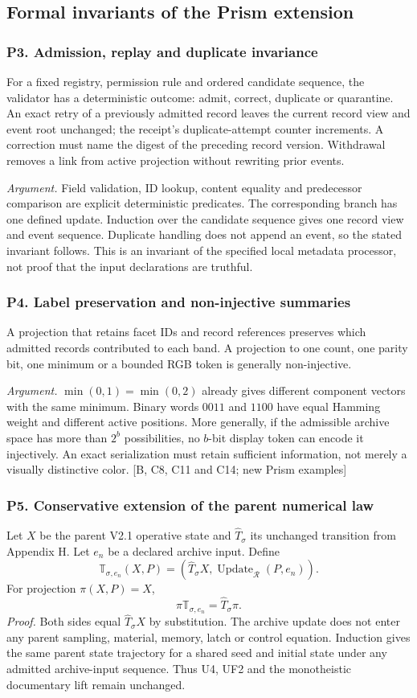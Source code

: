 \documentclass[11pt,a4paper]{article}
\newcommand{\newpagehead}[1]{\clearpage\subsection{#1}}
\newcommand{\source}[1]{{\sffamily\small\color{slate}[#1]}}
\begin{document}
\newpagehead{Formal invariants of the Prism extension}
\subsubsection{P3. Admission, replay and duplicate invariance}
For a fixed registry, permission rule and ordered candidate sequence, the validator has a deterministic outcome: admit, correct, duplicate or quarantine. An exact retry of a previously admitted record leaves the current record view and event root unchanged; the receipt's duplicate-attempt counter increments. A correction must name the digest of the preceding record version. Withdrawal removes a link from active projection without rewriting prior events.

\emph{Argument.} Field validation, ID lookup, content equality and predecessor comparison are explicit deterministic predicates. The corresponding branch has one defined update. Induction over the candidate sequence gives one record view and event sequence. Duplicate handling does not append an event, so the stated invariant follows. This is an invariant of the specified local metadata processor, not proof that the input declarations are truthful.

\subsubsection{P4. Label preservation and non-injective summaries}
A projection that retains facet IDs and record references preserves which admitted records contributed to each band. A projection to one count, one parity bit, one minimum or a bounded RGB token is generally non-injective.

\emph{Argument.} $\min(0,1)=\min(0,2)$ already gives different component vectors with the same minimum. Binary words $0011$ and $1100$ have equal Hamming weight and different active positions. More generally, if the admissible archive space has more than $2^b$ possibilities, no $b$-bit display token can encode it injectively. An exact serialization must retain sufficient information, not merely a visually distinctive color. \source{B, C8, C11 and C14; new Prism examples}

\subsubsection{P5. Conservative extension of the parent numerical law}
Let $X$ be the parent V2.1 operative state and $\widehat T_\sigma$ its unchanged transition from Appendix H. Let $e_n$ be a declared archive input. Define
\[
 \mathbb T_{\sigma,e_n}(X,P)=
       (\widehat T_\sigma X,\operatorname{Update}_{\mathcal R}(P,e_n)).
\]
For projection $\pi(X,P)=X$,
\[
 \pi\mathbb T_{\sigma,e_n}=\widehat T_\sigma\pi.
\]
\emph{Proof.} Both sides equal $\widehat T_\sigma X$ by substitution. The archive update does not enter any parent sampling, material, memory, latch or control equation. Induction gives the same parent state trajectory for a shared seed and initial state under any admitted archive-input sequence. Thus U4, UF2 and the monotheistic documentary lift remain unchanged.
\end{document}
